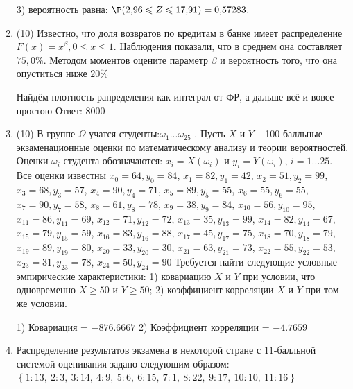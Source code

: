\documentclass[a4paper,14pt]{article}
\begin{document}
\begin{enumerate}
3) вероятность равна:
$
\P(2,\!96\leqslant Z\leqslant 17,\!91)=
0,\!57283.
$


\item


(10) Известно, что доля возвратов по кредитам в банке имеет распределение $F(x) = x ^{\beta}, 0 \leqslant x \leqslant 1$.
Наблюдения показали, что в среднем она составляет $75,0\%$. Методом моментов оцените параметр $\beta$ и
вероятность того, что она опуститься ниже $20\%$




Найдём плотность рапределения как интеграл от ФР, а дальше всё и вовсе простою Ответ: $8000$


\item


(10) В группе $\Omega$ учатся студенты:$\omega _{1}...\omega _{25}$ . Пусть $X$ и $Y$ – 100-балльные экзаменационные оценки по
математическому анализу и теории вероятностей. Оценки $\omega _{i}$ студента обозначаются: $x _{i} = X(\omega _{i})$ и $y _{i} = Y(\omega _{i})$, $i = 1...25$. Все оценки известны
$x _{0} = 64, y _{0} = 84$, $x _{1} = 82, y _{1} = 42$, $x _{2} = 51, y _{2} = 99$, $x _{3} = 68, y _{3} = 57$, $x _{4} = 90, y _{4} = 71$, $x _{5} = 89, y _{5} = 55$, $x _{6} = 55, y _{6} = 55$, $x _{7} = 90, y _{7} = 58$, $x _{8} = 61, y _{8} = 78$, $x _{9} = 38, y _{9} = 84$, $x _{10} = 56, y _{10} = 95$, $x _{11} = 86, y _{11} = 69$, $x _{12} = 71, y _{12} = 72$, $x _{13} = 35, y _{13} = 99$, $x _{14} = 82, y _{14} = 67$, $x _{15} = 79, y _{15} = 59$, $x _{16} = 83, y _{16} = 88$, $x _{17} = 45, y _{17} = 75$, $x _{18} = 70, y _{18} = 79$, $x _{19} = 89, y _{19} = 80$, $x _{20} = 33, y _{20} = 30$, $x _{21} = 63, y _{21} = 73$, $x _{22} = 55, y _{22} = 53$, $x _{23} = 31, y _{23} = 78$, $x _{24} = 50, y _{24} = 90$
Требуется
найти следующие условные эмпирические характеристики: 1) ковариацию $X$ и $Y$ при условии, что одновременно $X \geqslant 50$
 и $Y \geqslant 50$; 2) коэффициент корреляции $X$ и $Y$ при том же условии.




1) Ковариация = $-876.6667$
2) Коэффициент корреляции = $-4.7659$


\item

    
    	Распределение результатов экзамена в некоторой стране с $11$-балльной системой оценивания задано следующим образом:
    	$\left\{ 1 : 13, \  2 : 3, \  3 : 14, \  4 : 9, \  5 : 6, \  6 : 15, \  7 : 1, \  8 : 22, \  9 : 17, \  10 : 10, \  11 : 16\right\}$


\end{enumerate}
\end{document}
